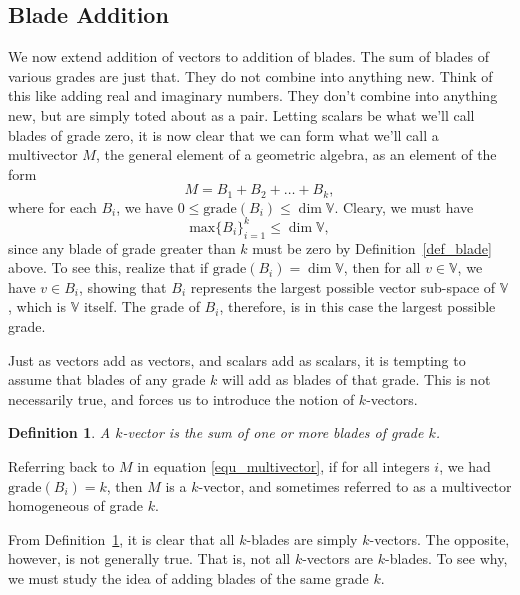 \documentclass[12pt]{article}
\newcommand{\V}{\mathbb{V}}
\newtheorem{definition}{Definition}[section]
\begin{document}
\subsection{Blade Addition}

We now extend addition of vectors to addition of blades.  The sum of blades
of various grades are just that.  They do not combine into anything new.
Think of this like adding real and imaginary numbers.  They don't combine
into anything new, but are simply toted about as a pair.  Letting scalars
be what we'll call blades of grade zero, it is now clear that we can form
what we'll call a multivector $M$, the general element of a geometric algebra,
as an element of the form
\begin{equation}\label{equ_multivector}
M = B_1 + B_2 + \dots + B_k,
\end{equation}
where for each $B_i$, we have $0\leq\mbox{grade}(B_i)\leq\dim\V$.
Cleary, we must have
\begin{equation}
\mbox{max}\{B_i\}_{i=1}^k\leq\dim\V,
\end{equation}
since any blade of grade greater than $k$ must be zero by Definition~\ref{def_blade} above.
To see this, realize that if $\mbox{grade}(B_i)=\dim\V$, then for all $v\in\V$, we have $v\in B_i$,
showing that $B_i$ represents the largest possible vector sub-space of $\V$, which is $\V$ itself.  The
grade of $B_i$, therefore, is in this case the largest possible grade.

Just as vectors add as vectors, and scalars add as scalars, it is tempting to assume
that blades of any grade $k$ will add as blades of that grade.  This is not necessarily true,
and forces us to introduce the notion of $k$-vectors.
\begin{definition}\label{def_k_vector}
A $k$-vector is the sum of one or more blades of grade $k$.
\end{definition}
Referring back to $M$ in equation \eqref{equ_multivector}, if for all integers $i$, we had
$\mbox{grade}(B_i)=k$, then $M$ is a $k$-vector, and sometimes referred
to as a multivector homogeneous of grade $k$.

From Definition~\ref{def_k_vector}, it is clear that all $k$-blades are simply
$k$-vectors.  The opposite, however, is not generally true.
That is, not all $k$-vectors are
$k$-blades.  To see why, we must study the idea of adding blades of the
same grade $k$.
\end{document}
